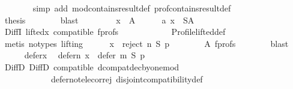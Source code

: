 \begin{isabellebody}
\ \ \ \ \ \ \isamarkupfalse%
\ {\isacharparenleft}{\kern0pt}simp\ add{\isacharcolon}{\kern0pt}\ mod{\isacharunderscore}{\kern0pt}contains{\isacharunderscore}{\kern0pt}result{\isacharunderscore}{\kern0pt}def\ prof{\isacharunderscore}{\kern0pt}contains{\isacharunderscore}{\kern0pt}result{\isacharunderscore}{\kern0pt}def{\isacharparenright}{\kern0pt}\isanewline
\ \ \ \ \isamarkupfalse%
\ {}{}\ {}{}\isanewline
\ \ \ \ \isamarkupfalse%
\ {\isacharquery}{\kern0pt}thesis\isanewline
\ \ \ \ \ \ \isamarkupfalse%
\ blast\isanewline
\ \ \isamarkupfalse%
\isanewline
\ \ \ \ \isamarkupfalse%
\ {\isachardoublequoteopen}x\ {\isasymnotin}\ A{\isachardoublequoteclose}\isanewline
\ \ \ \ \isamarkupfalse%
\ a{}{\isacharcolon}{\kern0pt}\ {\isachardoublequoteopen}x\ {\isasymin}\ S{\isacharminus}{\kern0pt}A{\isachardoublequoteclose}\isanewline
\ \ \ \ \ \ \isamarkupfalse%
\ DiffI\ lifted{\isacharunderscore}{\kern0pt}x\ compatible\ f{\isacharunderscore}{\kern0pt}profs\isanewline
\ \ \ \ \ \ \ \ \ \ \ \ Profile{\isachardot}{\kern0pt}lifted{\isacharunderscore}{\kern0pt}def\isanewline
\ \ \ \ \ \ \isamarkupfalse%
\ {\isacharparenleft}{\kern0pt}metis\ {\isacharparenleft}{\kern0pt}no{\isacharunderscore}{\kern0pt}types{\isacharcomma}{\kern0pt}\ lifting{\isacharparenright}{\kern0pt}{\isacharparenright}{\kern0pt}\isanewline
\ \ \ \ \isamarkupfalse%
\ {\isachardoublequoteopen}x\ {\isasymin}\ reject\ n\ S\ p{\isachardoublequoteclose}\isanewline
\ \ \ \ \ \ \isamarkupfalse%
\ A\ f{\isacharunderscore}{\kern0pt}profs\isanewline
\ \ \ \ \ \ \isamarkupfalse%
\ blast\isanewline
\ \ \ \ \isamarkupfalse%
\ defer{\isacharunderscore}{\kern0pt}x\ \isamarkupfalse%
\ defer{\isacharunderscore}{\kern0pt}n{\isacharcolon}{\kern0pt}\ {\isachardoublequoteopen}x\ {\isasymin}\ defer\ m\ S\ p{\isachardoublequoteclose}\isanewline
\ \ \ \ \ \ \isamarkupfalse%
\ DiffD{}\ DiffD{}\ compatible\ dcompat{\isacharunderscore}{\kern0pt}dec{\isacharunderscore}{\kern0pt}by{\isacharunderscore}{\kern0pt}one{\isacharunderscore}{\kern0pt}mod\isanewline
\ \ \ \ \ \ \ \ \ \ \ \ defer{\isacharunderscore}{\kern0pt}not{\isacharunderscore}{\kern0pt}elec{\isacharunderscore}{\kern0pt}or{\isacharunderscore}{\kern0pt}rej\ disjoint{\isacharunderscore}{\kern0pt}compatibility{\isacharunderscore}{\kern0pt}def\isanewline

\end{isabellebody}
